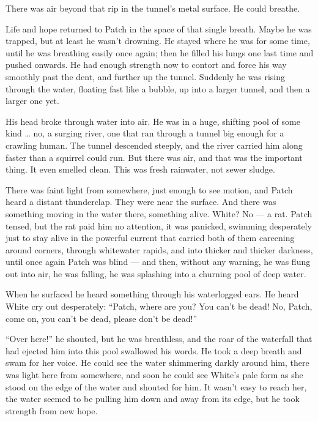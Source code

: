 \documentclass[ebook,oneside,openany,17pt]{memoir}
\newenvironment{tolerant}[1]{%
  \par\tolerance=#1\relax
}{%
  \par
}
\begin{document}
There was air beyond that rip in the tunnel’s metal surface. He could
breathe.

\begin{tolerant}{500}
Life and hope returned to Patch in the space of that single
breath. Maybe he was trapped, but at least he wasn’t drowning. He
stayed where he was for some time, until he was breathing easily once
again; then he filled his lungs one last time and push\-ed onwards. He
had enough strength now to contort and force his way smoothly past the
dent, and further up the tunnel. Suddenly he was rising through the
water, floating fast like a bubble, up into a larger tunnel, and then
a larger one yet.
\end{tolerant}

His head broke through water into air. He was in a huge, shifting pool
of some kind … no, a surging river, one that ran through a tunnel big
enough for a crawling human. The tunnel descended steeply, and the
river carried him along faster than a squirrel could run. But there
was air, and that was the important thing. It even smelled clean. This
was fresh rainwater, not sewer sludge.

\begin{tolerant}{5000}
There was faint light from somewhere, just enough to see motion, and
Patch heard a distant thunderclap. They were near the surface. And
there was something moving in the water there, something alive. White?
No — a rat. Patch tensed, but the rat paid him no attention, it was
panicked, swimming desperately just to stay alive in the powerful
current that carried both of them careening around corners, through
whitewater rapids, and into thicker and thick\-er darkness, until once
again Patch was blind — and then, without any warning, he was flung
out into air, he was falling, he was splashing into a churning pool of
deep water.
\end{tolerant}

When he surfaced he heard something through his waterlogged ears. He
heard White cry out desperately: “Patch, where are you? You can’t be
dead! No, Patch, come on, you can’t be dead, please don’t be dead!”

“Over here!” he shouted, but he was breathless, and the roar of the
waterfall that had ejected him into this pool swallowed his words. He
took a deep breath and swam for her voice. He could see the water
shimmering darkly around him, there was light here from somewhere, and
soon he could see White’s pale form as she stood on the edge of the
water and shouted for him. It wasn’t easy to reach her, the water
seemed to be pulling him down and away from its edge, but he took
strength from new hope.
\end{document}
